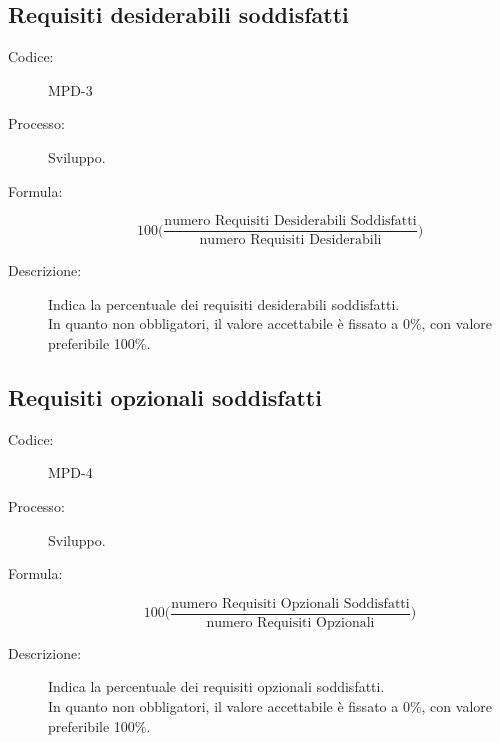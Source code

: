 \subsection{Requisiti desiderabili soddisfatti}
\begin{description}
    \item[Codice:] MPD-3
    \item[Processo:] Sviluppo.
    \item[Formula:]
    \begin{equation}
        100\biggl(\frac{\text{numero Requisiti Desiderabili Soddisfatti}}{\text{numero Requisiti Desiderabili}}\biggr)
    \end{equation}
    \item[Descrizione:] Indica la percentuale dei requisiti desiderabili soddisfatti.\\ In quanto non obbligatori, il valore accettabile è fissato a 0\%, con valore preferibile 100\%.
\end{description}

\subsection{Requisiti opzionali soddisfatti}
\begin{description}
    \item[Codice:] MPD-4
    \item[Processo:] Sviluppo.
    \item[Formula:]
    \begin{equation}
        100\biggl(\frac{\text{numero Requisiti Opzionali Soddisfatti}}{\text{numero Requisiti Opzionali}}\biggr)
    \end{equation}
    \item[Descrizione:] Indica la percentuale dei requisiti opzionali soddisfatti.\\ In quanto non obbligatori, il valore accettabile è fissato a 0\%, con valore preferibile 100\%.
\end{description}


